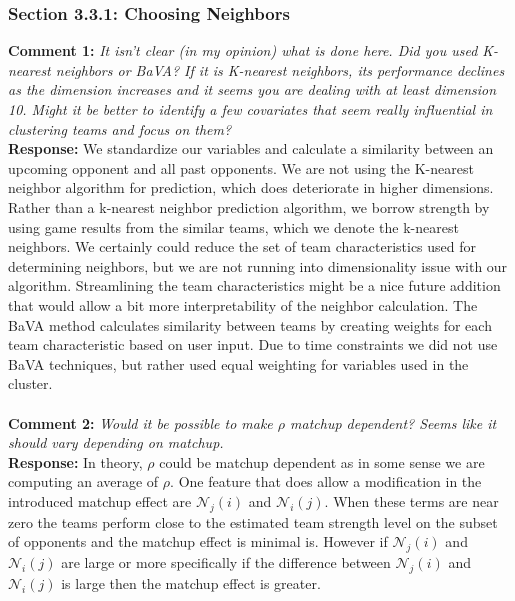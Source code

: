 \documentclass[11pt]{article} %
\begin{document}
\subsubsection*{Section 3.3.1: Choosing Neighbors}
{\bf Comment 1:} \emph{It isn't clear (in my opinion) what is done here. Did you used K-nearest neighbors or BaVA? If it is K-nearest neighbors, its performance declines as the dimension increases and it seems you are dealing with at least dimension 10. Might it be better to identify a few covariates that seem really influential in clustering teams and focus on them?\\}
{\bf Response:} We standardize our variables and calculate a similarity between an upcoming opponent and all past opponents. We are not using the K-nearest neighbor algorithm for prediction, which does deteriorate in higher dimensions. Rather than a k-nearest neighbor prediction algorithm, we  borrow strength by using game results from the similar teams, which we denote the k-nearest neighbors. We certainly could reduce the set of team characteristics used for determining neighbors, but we are not running into dimensionality issue with our algorithm. Streamlining the team characteristics might be a nice future addition that would allow a bit more interpretability of the neighbor calculation.  The BaVA method calculates similarity between teams by creating weights for each team characteristic based on user input. Due to time constraints we did not use BaVA techniques, but rather used equal weighting for variables used in the cluster. \\
\\
{\bf Comment 2:} \emph{Would it be possible to make $\rho$ matchup dependent? Seems like it should vary depending on matchup.\\}
{\bf Response:} In theory, $\rho$ could be matchup dependent as in some sense we are computing an average of $\rho.$ One feature that does allow a modification in the introduced matchup effect are $\mathcal{N}_j(i)$ and $\mathcal{N}_i(j).$ When these terms are near zero the teams perform close to the estimated team strength level on the subset of opponents and the matchup effect is minimal is. However if $\mathcal{N}_j(i)$ and $\mathcal{N}_i(j)$ are large or more specifically if the difference between $\mathcal{N}_j(i)$ and $\mathcal{N}_i(j)$ is large then the matchup effect is greater.\\
\end{document}

